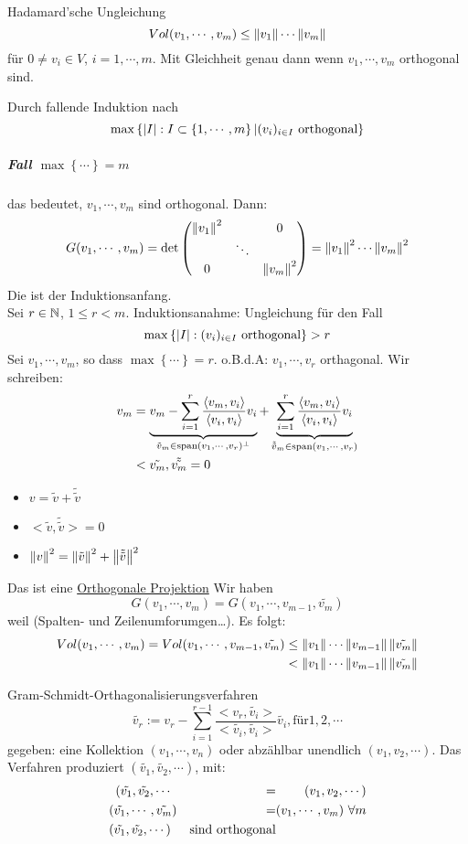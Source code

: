 \begin{Sat}{Hadamard'sche Ungleichung}
  \[Vol(v_1,\cdots,v_m)\leq \left\| v_1 \right\|\cdots\left\| v_m \right\|\]
  für $0\neq v_i\in V$, $i=1,\cdots,m$. Mit Gleichheit genau dann wenn $v_1,\cdots,v_m$ orthogonal sind.
\end{Sat}
\begin{Bew}
  Durch fallende Induktion nach
  \[\max\left\{ \left| I \right|:I\subset\left\{ 1,\cdots,m \right\}|(v_i)_{i\in I}\ \text{orthogonal} \right\}\]
  \subparagraph{Fall $\max\left\{ \cdots \right\}=m$} das bedeutet, $v_1,\cdots,v_m$ sind orthogonal. Dann:
  \[G(v_1,\cdots,v_m)=\det\begin{pmatrix}\left\| v_1 \right\|^2& &0\\ & \ddots & \\ 0 & & \left\| v_m \right\|^2\end{pmatrix}=\left\| v_1 \right\|^2\cdots\left\| v_m \right\|^2\]
  Die ist der Induktionsanfang.\\
  Sei $r\in\mathbb{N}$, $1\leq r <m$. Induktionsanahme: Ungleichung für den Fall
  \[\max\left\{ \Abs{I}:(v_i)_{i\in I}\ \text{orthogonal} \right\}>r\]
  Sei $v_1,\cdots,v_m$, so dass $\max\left\{ \cdots \right\}=r$. o.B.d.A: $v_1,\cdots,v_r$ orthagonal. Wir schreiben:
  \begin{align*}
    v_m & =\underbrace{v_m-\sum^r_{i=1}\frac{\langle v_m,v_i\rangle }{\langle v_i,v_i\rangle }v_i}_{\tilde{v}_m \in \operatorname{span} (v_1,\cdots,v_r)^\perp} +\underbrace{\sum^r_{i=1}\frac{\langle v_m,v_i\rangle }{\langle v_i,v_i\rangle }v_i}_{\tilde{\tilde{v}}_m\in \operatorname{span} (v_1,\cdots,v_r)}\\
    & < \tilde{v_m},\tilde{\tilde{v_m}}=0
  \end{align*}
  \begin{itemize}
    \item $v=\tilde{v}+\tilde{\tilde{v}}$
    \item $<\tilde{v},\tilde{\tilde{v}}>=0$
    \item $\left\| v \right\|^2=\left\| \tilde{v} \right\|^2+\left\| \tilde{\tilde{v}} \right\|^2$
  \end{itemize}
  Das ist eine \underline{Orthogonale Projektion}
  Wir haben 
  \[G(v_1,\cdots,v_m)=G(v_1,\cdots,v_{m-1},\tilde{v_m})\]
  weil (Spalten- und Zeilenumforumgen\ldots). Es folgt:
  \begin{align*}
    Vol(v_1,\cdots,v_m)=Vol(v_1,\cdots,v_{m-1},\tilde{v_m}) &\leq \left\| v_1 \right\|\cdots\left\| v_{m-1} \right\|\left\| \tilde{v_m} \right\|\\
    & <\left\| v_1 \right\|\cdots\left\| v_{m-1} \right\|\left\| \tilde{v_m} \right\|
  \end{align*}
\end{Bew}
\begin{Def}{Gram-Schmidt-Orthagonalisierungsverfahren}
  \[\tilde{v_r}:=v_r-\sum^{r-1}_{i=1}\frac{<v_r,\tilde{v_i}>}{<\tilde{v_i},\tilde{v_i}>}\tilde{v_i}, \text{für} 1,2,\cdots\]
  gegeben: eine Kollektion $(v_1,\cdots,v_n)$ oder abzählbar unendlich $(v_1,v_2,\cdots)$. Das Verfahren produziert $(\tilde{v_1},\tilde{v_2},\cdots)$, mit:
  \begin{align*}
    \span(\tilde{v_1},\tilde{v_2},\cdots&=&\span(v_1,v_2,\cdots)\\
    \span(\tilde{v_1},\cdots,\tilde{v_m})&=& \span(v_1,\cdots,v_m)\ \forall m\\
    (\tilde{v_1},\tilde{v_2},\cdots) & & \text{sind orthogonal}
  \end{align*}
\end{Def}
